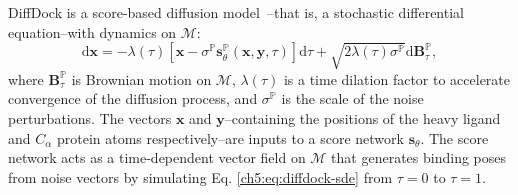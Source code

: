 DiffDock is a score-based diffusion model~\cite{Song2021ScoreBased}--that is, a stochastic differential equation--with dynamics on $\mathcal{M}$:
\begin{equation}
    \label{ch5:eq:diffdock-sde}
        \mathrm{d}\mathbf{x} = - \lambda(\tau) 
        \left[ \mathbf{x} - \sigma^{\mathbb{P}}\mathbf{s}^\mathbb{P}_\theta(\mathbf{x}, \mathbf{y}, \tau) \right]
        \mathrm{d}\tau + \sqrt{2 \lambda(\tau) \sigma^{\mathbb{P}}}\mathrm{d}\mathbf{B}^{\mathbb{P}}_\tau,
\end{equation}
where $\mathbf{B}_\tau^{\mathbb{P}}$ is Brownian motion on $\mathcal{M}$, $\lambda(\tau)$ is a time dilation factor to accelerate convergence of the diffusion process, and $\sigma^{\mathbb{P}}$ is the scale of the noise perturbations. The vectors $\mathbf{x}$ and $\mathbf{y}$--containing the positions of the heavy ligand and $C_\alpha$ protein atoms respectively--are inputs to a score network $\mathbf{s}_\theta$. The score network acts as a time-dependent vector field on $\mathcal{M}$ that generates binding poses from noise vectors by simulating Eq. \ref{ch5:eq:diffdock-sde} from $\tau = 0$ to $\tau = 1$.

